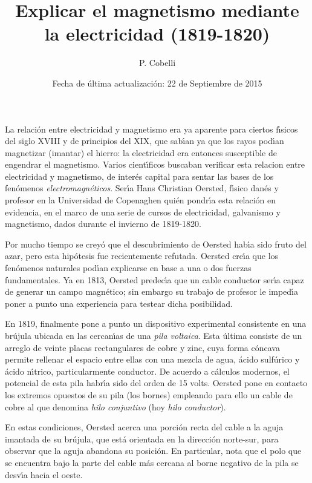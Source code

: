 \documentclass{article}
\begin{document}
\title{Explicar el magnetismo mediante la electricidad (1819-1820)}
\author{P. Cobelli}
\date{Fecha de \'ultima actualizaci\'on: 22 de Septiembre de 2015}
\maketitle

La relaci\'on entre electricidad y magnetismo era ya aparente para ciertos
f\'\i sicos del siglo XVIII y de principios del XIX, que sab\'\i an ya que
los rayos pod\'\i an magnetizar (imantar) el hierro: la electricidad era
entonces susceptible de engendrar el magnetismo. Varios cient\'\i ficos 
buscaban verificar esta relacion entre electricidad y magnetismo, de inter\'es
capital para sentar las bases de los fen\'omenos {\it electromagn\'eticos}.
Ser\'\i a Hans Christian Oersted, f\'\i sico dan\'es y profesor en la 
Universidad de Copenaghen qui\'en pondr\'\i a esta relaci\'on en evidencia,
en el marco de una serie de cursos de electricidad, galvanismo y magnetismo, 
dados durante el invierno de 1819-1820. 

Por mucho tiempo se crey\'o que el descubrimiento de Oersted hab\'\i a sido
fruto del azar, pero esta hip\'otesis fue recientemente refutada. Oersted
cre\'\i a que los fen\'omenos naturales pod\'\i an explicarse en base a una
o dos fuerzas fundamentales. Ya en 1813, Oersted predec\'\i a que un cable 
conductor ser\'\i a capaz de generar un campo magn\'etico; sin embargo su 
trabajo de profesor le imped\'\i a poner a punto una experiencia para testear
dicha posibilidad. 

En 1819, finalmente pone a punto un dispositivo experimental consistente en 
una br\'ujula ubicada en las cercan\'\i as de una {\it pila voltaica}. Esta
\'ultima consiste de un arreglo de veinte placas rectangulares de cobre
y zinc, cuya forma c\'oncava permite rellenar el espacio entre ellas con una
mezcla de agua, \'acido sulf\'urico y \'acido n\'\i trico, particularmente
conductor. De acuerdo a c\'alculos modernos, el potencial de esta pila 
habr\'\i a sido del orden de 15 volts. Oersted pone en contacto los extremos
opuestos de su pila (los bornes) empleando para ello un cable de cobre al 
que denomina {\it hilo conjuntivo} (hoy {\it hilo conductor}). 

En estas condiciones, Oersted acerca una porci\'on recta del cable a la
aguja imantada de su br\'ujula, que est\'a orientada en la direcci\'on norte-sur,
para observar que la aguja abandona su posici\'on. En particular, nota que
el polo que se encuentra bajo la parte del cable m\'as cercana al borne 
negativo de la pila se desv\'\i a hacia el oeste.
\end{document}
